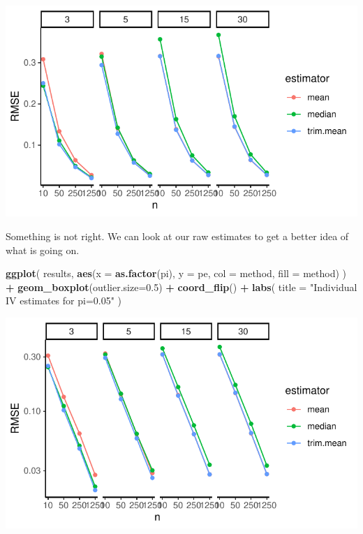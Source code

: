 \documentclass[
]{book}
\newenvironment{Shaded}{\begin{snugshade}}{\end{snugshade}}
\newcommand{\AttributeTok}[1]{\textcolor[rgb]{0.13,0.29,0.53}{#1}}
\newcommand{\FloatTok}[1]{\textcolor[rgb]{0.00,0.00,0.81}{#1}}
\newcommand{\FunctionTok}[1]{\textcolor[rgb]{0.13,0.29,0.53}{\textbf{#1}}}
\newcommand{\NormalTok}[1]{#1}
\newcommand{\SpecialCharTok}[1]{\textcolor[rgb]{0.81,0.36,0.00}{\textbf{#1}}}
\newcommand{\StringTok}[1]{\textcolor[rgb]{0.31,0.60,0.02}{#1}}
\begin{document}
\begin{center}\includegraphics[width=0.75\linewidth]{Designing-Simulations-in-R_files/figure-latex/unnamed-chunk-174-1} \end{center}

Something is not right.
We can look at our raw estimates to get a better idea of what is going on.

\begin{Shaded}
\begin{Highlighting}[]
\FunctionTok{ggplot}\NormalTok{( results,}
        \FunctionTok{aes}\NormalTok{(}\AttributeTok{x =} \FunctionTok{as.factor}\NormalTok{(pi), }\AttributeTok{y =}\NormalTok{ pe, }
            \AttributeTok{col =}\NormalTok{ method, }\AttributeTok{fill =}\NormalTok{ method) ) }\SpecialCharTok{+}
  \FunctionTok{geom\_boxplot}\NormalTok{(}\AttributeTok{outlier.size=}\FloatTok{0.5}\NormalTok{) }\SpecialCharTok{+}
  \FunctionTok{coord\_flip}\NormalTok{() }\SpecialCharTok{+}
  \FunctionTok{labs}\NormalTok{( }\AttributeTok{title =} \StringTok{"Individual IV estimates for pi=0.05"}\NormalTok{ )}
\end{Highlighting}
\end{Shaded}

\begin{center}\includegraphics[width=0.75\linewidth]{Designing-Simulations-in-R_files/figure-latex/unnamed-chunk-175-1} \end{center}
\end{document}
